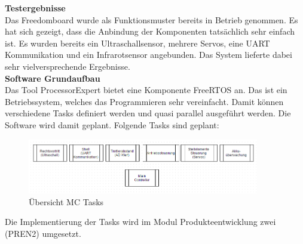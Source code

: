 \textbf{Testergebnisse}\\[0.2cm]
Das Freedomboard wurde als Funktionsmuster bereits in Betrieb genommen. Es hat sich gezeigt, dass die Anbindung der Komponenten tatsächlich sehr einfach ist. Es wurden bereits ein Ultraschallsensor, mehrere Servos, eine UART Kommunikation und ein Infrarotsensor angebunden. Das System lieferte dabei sehr vielversprechende Ergebnisse.\\[0.2cm]
\textbf{Software Grundaufbau}\\[0.2cm]
Das Tool ProcessorExpert bietet eine Komponente FreeRTOS an. Das ist ein Betriebssystem, welches das Programmieren sehr vereinfacht. Damit können verschiedene Tasks definiert werden und quasi parallel ausgeführt werden. Die Software wird damit geplant. Folgende Tasks sind geplant:
\begin{figure}[H]
	\centering
	\includegraphics[width=0.9\textwidth]{03_Loesungskonzept/pictures/MC_Tasks.png}
	\caption{Übersicht MC Tasks}
\end{figure}
Die Implementierung der Tasks wird im Modul Produkteentwicklung zwei (PREN2) umgesetzt.